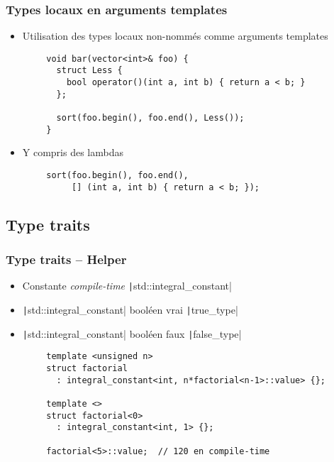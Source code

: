 \documentclass[C++.tex]{subfiles}
\begin{document}
\begin{frame}[fragile]
	\frametitle{Types locaux en arguments templates}
	\begin{itemize}
		\item Utilisation des types locaux non-nommés comme arguments templates
	\end{itemize}

	\begin{verbatim}
		void bar(vector<int>& foo) {
		  struct Less {
		    bool operator()(int a, int b) { return a < b; }
		  };

		  sort(foo.begin(), foo.end(), Less());
		}
	\end{verbatim}

	\begin{itemize}
		\item Y compris des lambdas
	\end{itemize}

	\begin{verbatim}
		sort(foo.begin(), foo.end(),
		     [] (int a, int b) { return a < b; });
 	\end{verbatim}

\end{frame}

\subsection*{Type traits}
\begin{frame}[fragile]
	\frametitle{Type traits -- Helper}
	\begin{itemize}
		\item Constante \textit{compile-time} \texttt|std::integral_constant|
		\item \texttt|std::integral_constant| booléen vrai \texttt|true_type|
		\item \texttt|std::integral_constant| booléen faux \texttt|false_type|
	\end{itemize}

	\begin{verbatim}
		template <unsigned n>
		struct factorial 
		  : integral_constant<int, n*factorial<n-1>::value> {};

		template <>
		struct factorial<0> 
		  : integral_constant<int, 1> {};

		factorial<5>::value;  // 120 en compile-time
	\end{verbatim}
\end{frame}
\end{document}
